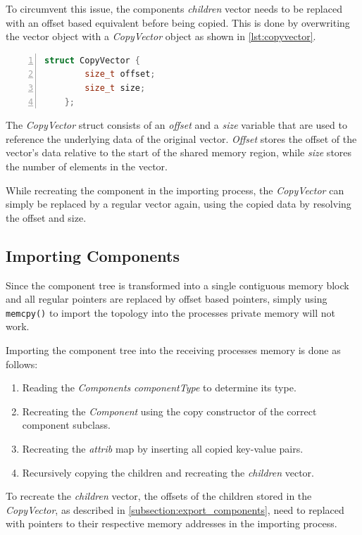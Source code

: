 To circumvent this issue, the components \emph{children} vector needs to be replaced with an offset based equivalent before being copied.
This is done by overwriting the vector object with a \emph{CopyVector} object as shown in \autoref{lst:copyvector}.

\begin{lstlisting}[language=c++, numbers=left, caption=Component Class, captionpos=b, label={lst:copyvector}]
    struct CopyVector {
        size_t offset;
        size_t size;
    };
\end{lstlisting}

The \emph{CopyVector} struct consists of an \emph{offset} and a \emph{size} variable that are used to reference the underlying data of the original vector.
\emph{Offset} stores the offset of the vector's data relative to the start of the shared memory region, while \emph{size} stores the number of elements in the vector.

While recreating the component in the importing process, the \emph{CopyVector} can simply be replaced by a regular vector again, using the copied data by resolving the offset and size.

\subsection{Importing Components}
Since the component tree is transformed into a single contiguous memory block and all regular pointers are replaced by offset based pointers, simply using \lstinline{memcpy()} to import the topology into the processes private memory will not work.

Importing the component tree into the receiving processes memory is done as follows:

\begin{enumerate}
    \item Reading the \emph{Components} \emph{componentType} to determine its type.
    \item Recreating the \emph{Component} using the copy constructor of the correct component subclass.
    \item Recreating the \emph{attrib} map by inserting all copied key-value pairs.
    \item Recursively copying the children and recreating the \emph{children} vector.
\end{enumerate}

To recreate the \emph{children} vector, the offsets of the children stored in the \emph{CopyVector}, as described in \autoref{subsection:export_components},
need to replaced with pointers to their respective memory addresses in the importing process.


